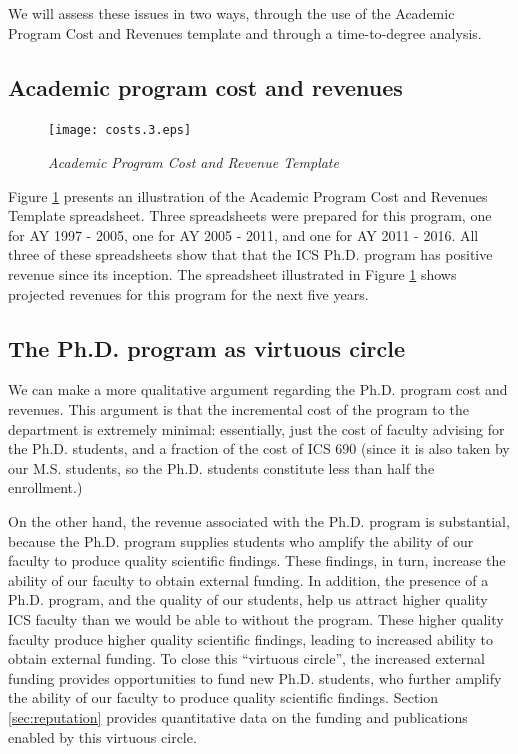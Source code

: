 \documentclass[12pt]{article}
\begin{document}
We will assess these issues in two ways, through the use of the Academic
Program Cost and Revenues template and through a time-to-degree analysis.

\subsection{Academic program cost and revenues}
\label{sec:costs}

\begin{figure}[ht]
  \center
  \texttt{[image: costs.3.eps]}
  \caption{\em \small Academic Program Cost and Revenue Template}
  \label{fig:costs}
\end{figure} 

Figure \ref{fig:costs} presents an illustration of the Academic Program
Cost and Revenues Template spreadsheet.  Three spreadsheets were prepared
for this program, one for AY 1997 - 2005, one for AY 2005 - 2011, and one
for AY 2011 - 2016.  All three of these spreadsheets show that that the ICS
Ph.D. program has positive revenue since its inception.  The spreadsheet 
illustrated in Figure \ref{fig:costs} shows projected revenues for this
program for the next five years. 

\subsection{The Ph.D. program as virtuous circle}
\label{sec:virtuous-circle}

We can make a more qualitative argument regarding the
Ph.D. program cost and revenues.  This argument is that the incremental
cost of the program to the department is extremely minimal: essentially,
just the cost of faculty advising for the Ph.D. students, and a fraction of
the cost of ICS 690 (since it is also taken by our M.S. students, so the
Ph.D. students constitute less than half the enrollment.)

On the other hand, the revenue associated with the Ph.D. program is
substantial, because the Ph.D. program supplies students who amplify the
ability of our faculty to produce quality scientific findings.  These
findings, in turn, increase the ability of our faculty to obtain external
funding.  In addition, the presence of a Ph.D. program, and the quality of
our students, help us attract higher quality ICS faculty than we would be
able to without the program.  These higher quality faculty produce higher
quality scientific findings, leading to increased ability to obtain
external funding.  To close this ``virtuous circle'', the increased
external funding provides opportunities to fund new Ph.D. students, who
further amplify the ability of our faculty to produce quality scientific
findings.  Section \ref{sec:reputation} provides quantitative data on the
funding and publications enabled by this virtuous circle.
\end{document}
